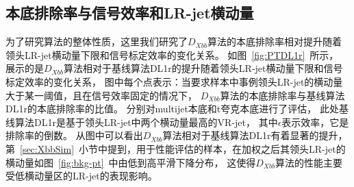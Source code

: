 \subsection{本底排除率与信号效率和LR-jet横动量}
\label{sec:XbbPerf5}

为了研究算法的整体性质，这里我们研究了$D_{Xbb}$算法的本底排除率相对提升随着领头LR-jet横动量下限和信号标定效率的变化关系。
如图~\ref{fig:PTDL1r}~所示，
展示的是$D_{Xbb}$算法相对于基线算法DL1r的提升随着领头LR-jet横动量下限和信号标定效率的变化关系，
图中每个点表示：当要求样本中事例领头LR-jet的横动量大于某一阈值，且在信号效率固定的情况下，
$D_{Xbb}$算法的本底排除率与基线算法DL1r的本底排除率的比值。
分别对multijet本底和t夸克本底进行了评估，
此处基线算法DL1r是基于领头LR-jet中两个横动量最高的VR-jet，
其中$\epsilon$表示效率，它是排除率的倒数。
从图中可以看出$D_{Xbb}$算法相对于基线算法DL1r有着显著的提升，
第~\ref{sec:XbbSim}~小节中提到，用于性能评估的样本，在加权之后其领头LR-jet的横动量如图~\ref{fig:bkg-pt}~中由低到高平滑下降分布，
这使得$D_{Xbb}$算法的性能主要受低横动量区的LR-jet的表现影响。



